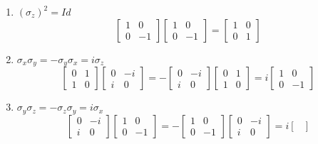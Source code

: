 \documentclass[12pt]{article}
\begin{document}
\begin{enumerate}[(a)]
\begin{enumerate}[]
			\item $ \left(\sigma_z\right)^2 = Id$
				\[
				\begin{bmatrix}
					1 & 0\\
					0 & -1
				\end{bmatrix}
				\begin{bmatrix}
					1 & 0\\
					0 & -1
				\end{bmatrix}
				=
				\begin{bmatrix}
					1 & 0\\
					0 & 1
				\end{bmatrix}
				\]
			\item $ \sigma_x\sigma_y = -\sigma_y\sigma_x = i\sigma_z $
				\[
					\begin{bmatrix}
						0 & 1\\
						1 & 0
					\end{bmatrix}
					\begin{bmatrix}
						0 & -i\\
						i & 0
					\end{bmatrix}
					= -
					\begin{bmatrix}
						0 & -i\\
						i & 0
					\end{bmatrix}
					\begin{bmatrix}
						0 & 1\\
						1 & 0
					\end{bmatrix}
					= i
					\begin{bmatrix}
						1 & 0\\
						0 & -1
					\end{bmatrix}
				\]
			\item $ \sigma_y\sigma_z = -\sigma_z\sigma_y = i\sigma_x $
				\[
					\begin{bmatrix}
						0 & -i\\
						i & 0
					\end{bmatrix}
					\begin{bmatrix}
						1 & 0\\
						0 & -1
					\end{bmatrix}
					=-
					\begin{bmatrix}
						1 & 0\\
						0 & -1
					\end{bmatrix}
					\begin{bmatrix}
						0 & -i\\
						i & 0
					\end{bmatrix}
					=i
					\begin{bmatrix}

\end{bmatrix}\]
\end{enumerate}
\end{enumerate}
\end{document}
